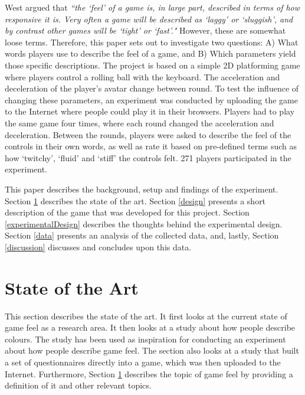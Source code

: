 West argued that \textit{``the `feel' of a game is, in large part, described in terms of how responsive it is. Very often a game will be described as `laggy' or `sluggish', and by contrast other games will be `tight' or `fast'."} \cite{measure_lag} However, these are somewhat loose terms. Therefore, this paper sets out to investigate two questions: A) What words players use to describe the feel of a game, and B) Which parameters yield those specific descriptions. The project is based on a simple 2D platforming game where players control a rolling ball with the keyboard. The acceleration and deceleration of the player's avatar change between round. To test the influence of changing these parameters, an experiment was conducted by uploading the game to the Internet where people could play it in their browsers. Players had to play the same game four times, where each round changed the acceleration and deceleration. Between the rounds, players were asked to describe the feel of the controls in their own words, as well as rate it based on pre-defined terms such as how `twitchy', `fluid' and `stiff' the controls felt. 271 players participated in the experiment.


This paper describes the background, setup and findings of the experiment. Section \ref{stateOfTheArt} describes the state of the art. Section \ref{design} presents a short description of the game that was developed for this project. Section \ref{experimentalDesign} describes the thoughts behind the experimental design. Section \ref{data} presents an analysis of the collected data, and, lastly, Section \ref{discussion} discusses and concludes upon this data.

\section{State of the Art} \label{stateOfTheArt}
This section describes the state of the art. It first looks at the current state of game feel as a research area. It then looks at a study about how people describe colours. The study has been used as inspiration for conducting an experiment about how people describe game feel. The section also looks at a study that built a set of questionnaires directly into a game, which was then uploaded to the Internet. Furthermore, Section \ref{stateOfTheArt} describes the topic of game feel by providing a definition of it and other relevant topics.

